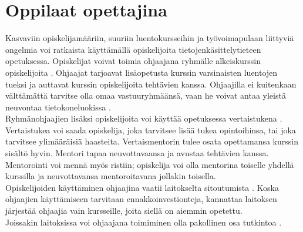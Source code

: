 \documentclass[finnish]{tktltiki2}
\theoremstyle{definition}
\theoremstyle{remark}
\begin{document}
\section{Oppilaat opettajina}
Kasvaviin opiskelijamääriin, suuriin luentokursseihin ja työvoimapulaan liittyviä ongelmia voi ratkaista käyttämällä opiskelijoita tietojenkäsittelytieteen opetuksessa. Opiskelijat voivat toimia ohjaajana ryhmälle alkeiskurssin o\-pis\-ke\-li\-joi\-ta \cite{Reges88}. Ohjaajat tarjoavat lisäopetusta kurssin varsinaisten luentojen tueksi ja auttavat kurssin opiskelijoita tehtävien kanssa. Ohjaajilla ei kuitenkaan välttämättä tarvitse olla omaa vastuuryhmäänsä, vaan he voivat antaa yleistä neuvontaa tietokoneluokissa \cite{Vikberg, Vihavainen}.
\\
Ryhmänohjaajien lisäksi opiskelijoita voi käyttää opetuksessa vertaistukena \cite{Tashakkori05}. Vertaistukea voi saada opiskelija, joka tarvitsee lisää tukea opintoihinsa, tai joka tarvitsee ylimääräisiä haasteita. Vertaismentorin tulee osata opettamansa  kurssin sisältö hyvin. Mentori tapaa neuvottavaansa ja avustaa tehtävien kanssa. Mentorointi voi mennä myös ristiin; opiskelija voi olla mentorina toiselle yhdellä kurssilla ja neuvottavansa mentoroitavana jollakin toisella.
\\
Opiskelijoiden käyttäminen ohjaajina vaatii laitokselta sitoutumista \cite{Kopp00}. Koska ohjaajien käyttämiseen tarvitaan ennakkoinvestionteja, kannattaa laitoksen järjestää ohjaajia vain kursseille, joita siellä on aiemmin opetettu. 
\\
Joissakin laitoksissa voi ohjaajana toimiminen olla pakollinen osa tutkintoa \cite{Kay95}.
\end{document}
